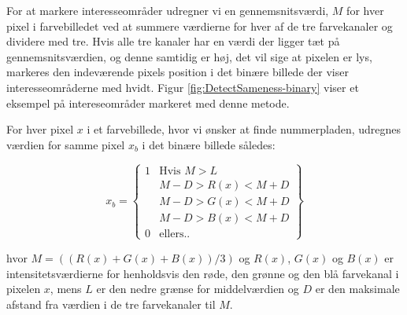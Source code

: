 For at markere interesseområder udregner vi en gennemsnitsværdi, $M$ for hver pixel i farvebilledet ved at summere værdierne for hver af de tre farvekanaler og dividere med tre. Hvis alle tre kanaler har en værdi der ligger tæt på gennemsnitsværdien, og denne samtidig er høj, det vil sige at pixelen er lys, markeres den indeværende pixels position i det binære billede der viser interesseområderne med hvidt. Figur \ref{fig:DetectSameness-binary} viser et eksempel på intereseområder markeret med denne metode. 

For hver pixel $x$ i et farvebillede, hvor vi ønsker at finde nummerpladen, udregnes værdien for samme pixel $x_{b}$ i det binære billede således:

\begin{equation}
x_{b} = 
\begin{Bmatrix}
1 & \text{Hvis } M > L\\
 & M-D > R(x) < M+D\\
  & M-D > G(x) < M+D\\
   & M-D > B(x) < M+D\\
0 & \text{ellers..}
\end{Bmatrix}
\end{equation}


hvor $M = ((R(x)+G(x)+B(x))/3)$ og $R(x)$, $G(x)$ og $B(x)$ er intensitetsværdierne for henholdsvis den røde, den grønne og den blå farvekanal i pixelen $x$, mens $L$ er den nedre grænse for middelværdien og $D$ er den maksimale afstand fra værdien i de tre farvekanaler til $M$.




